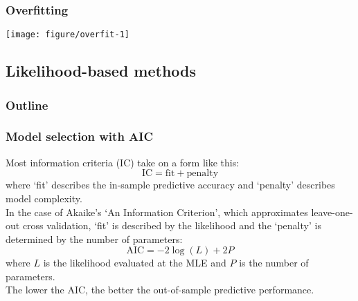 \documentclass[color=usenames,dvipsnames]{beamer}\usepackage[]{graphicx}\usepackage[]{xcolor}
\begin{document}
\begin{frame}[fragile]
  \frametitle{Overfitting}
  \centering
  \texttt{[image: figure/overfit-1]} \\
\end{frame}

\subsection{Likelihood-based methods}



\begin{frame}
  \frametitle{Outline}
  \Large
\end{frame}





\begin{frame}
  \frametitle{Model selection with AIC}
  \small
  Most information criteria (IC) take on a form like this:
  \[
     \mathrm{IC} = \mathrm{fit} + \mathrm{penalty}
  \]
  where `fit' describes the \alert{in-sample} predictive accuracy and 
  `penalty' describes model complexity. \\
  \pause
  \vfill
  In the case of Akaike's `An Information Criterion', which
  approximates leave-one-out cross validation, `fit' is described by
  the likelihood and the `penalty' is determined by the number of parameters:
  \[
     \mathrm{AIC} = -2 \log(L) + 2P 
   \]
   where $L$ is the likelihood evaluated at the MLE and $P$ is
   the number of parameters. \\
   \pause
   \vfill
   The lower the AIC, the better the \alert{out-of-sample} predictive
   performance.
\end{frame}




\end{document}
